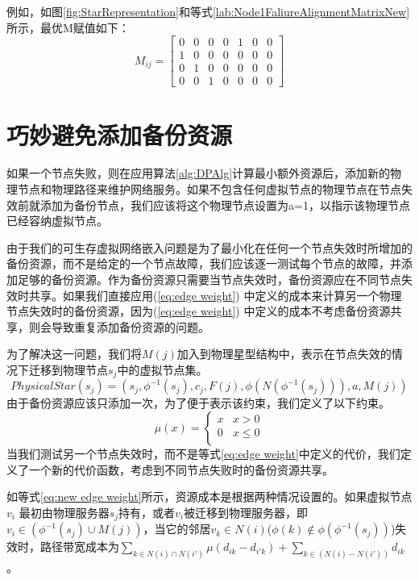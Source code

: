 例如，如图\ref{fig:StarRepresentation}和等式\ref{lab:Node1FaliureAlignmentMatrixNew} 所示，最优M赋值如下：
\begin{equation}
M_{ij}=\left[ {\begin{array}{*{20}{c}}
0&0&0&0&1&0&0\\
1&0&0&0&0&0&0\\
0&1&0&0&0&0&0\\
0&0&1&0&0&0&0
\end{array}} \right]
\end{equation}
\section{巧妙避免添加备份资源}
如果一个节点失败，则在应用算法\ref{alg:DPAlg}计算最小额外资源后，添加新的物理节点和物理路径来维护网络服务。如果不包含任何虚拟节点的物理节点在节点失效前就添加为备份节点，我们应该将这个物理节点设置为a=1，以指示该物理节点已经容纳虚拟节点。

由于我们的可生存虚拟网络嵌入问题是为了最小化在任何一个节点失效时所增加的备份资源，而不是给定的一个节点故障，我们应该逐一测试每个节点的故障，并添加足够的备份资源。作为备份资源只需要当节点失效时，备份资源应在不同节点失效时共享。如果我们直接应用(\ref{eq:edge weight}) 中定义的成本来计算另一个物理节点失效时的备份资源，因为(\ref{eq:edge weight}) 中定义的成本不考虑备份资源共享，则会导致重复添加备份资源的问题。

为了解决这一问题，我们将$M(j)$加入到物理星型结构中，表示在节点失效的情况下迁移到物理节点$s_j$中的虚拟节点集。
\begin{equation}
PhysicalStar(s_j)=(s_j, \phi^{-1}( s_j), c_j, F(j), \phi(N(\phi^{-1}( s_j))), a, M(j))
\end{equation}
由于备份资源应该只添加一次，为了便于表示该约束，我们定义了以下约束。
\begin{equation}
\mu (x) = \left\{ {\begin{array}{*{20}{c}}
   x & {x > 0}  \\
   0 & {x \le 0}  \\
\end{array}} \right.
\end{equation}
当我们测试另一个节点失效时，而不是等式\ref{eq:edge weight}中定义的代价，我们定义了一个新的代价函数，考虑到不同节点失败时的备份资源共享。

如等式\ref{eq:new edge weight}所示，资源成本是根据两种情况设置的。如果虚拟节点$v_i$ 最初由物理服务器$s_j$持有，或者$v_i$被迁移到物理服务器，即${{v_i} \in \left( {{\phi ^{ - 1}}({s_j}) \cup M(j)} \right)}$，当它的邻居$v_k \in N(i)$(${\phi \left( k \right) \notin \phi \left( {{\phi ^{ - 1}}({s_j})} \right)}$)失效时，路径带宽成本为${\sum\limits_{k \in N(i) \cap N(i')} {\mu({d_{ik}} - {d_{i'k}})}  + \sum\limits_{k \in \left( {N(i) - N(i')} \right)} {{d_{ik}}} }$。

